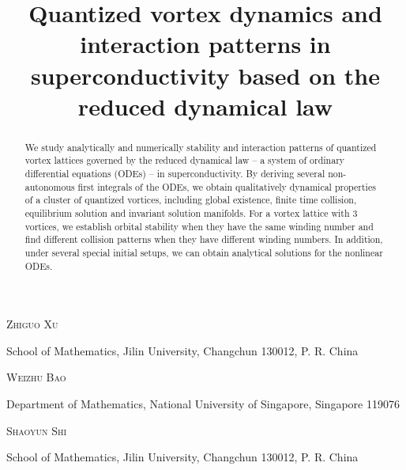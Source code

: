 \documentclass{aims}
\title[Quantized vortex dynamics in superconductivity]
{Quantized vortex dynamics and interaction patterns in superconductivity based on the reduced dynamical law}
\author[Zhiguo Xu, Weizhu Bao and Shaoyun Shi]{}
\theoremstyle{plain}
\theoremstyle{definition}
\begin{document}
\maketitle

\centerline{\scshape Zhiguo Xu}
\smallskip
{\footnotesize
 \centerline{School of Mathematics, Jilin University, Changchun 130012, P.
R. China}
}

\bigskip

\centerline{\scshape Weizhu Bao}
\smallskip
{\footnotesize
 \centerline{Department of Mathematics,  National University of Singapore, Singapore 119076}
}

\bigskip

\centerline{\scshape Shaoyun Shi}
\smallskip
{\footnotesize
 \centerline{School of Mathematics, Jilin University, Changchun 130012, P.
R. China}
}

\begin{abstract}
We study analytically and numerically stability and interaction patterns
of quantized vortex lattices governed by the reduced dynamical law -- a system of ordinary differential equations (ODEs) -- in superconductivity.
By deriving several non-autonomous first integrals of the ODEs, we obtain qualitatively dynamical properties of a cluster of quantized vortices, including global existence, finite time collision, equilibrium solution
and invariant solution manifolds. For a vortex lattice with 3 vortices, we establish orbital stability when they have the same winding number and find different collision patterns when they have different winding numbers. In addition, under several special initial setups,
we can obtain analytical solutions for the nonlinear ODEs.
\end{abstract}

\end{document}
